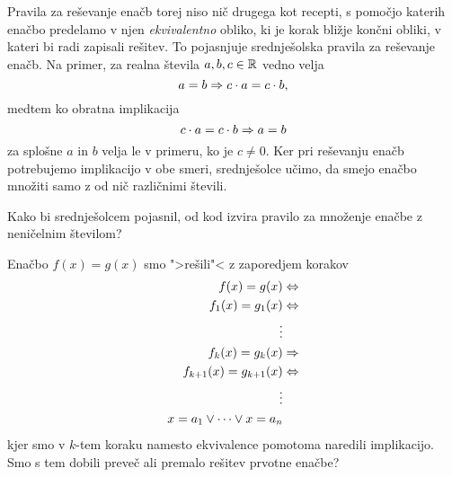 Pravila za reševanje enačb torej niso nič drugega kot recepti, s
pomočjo katerih enačbo predelamo v njen \emph{ekvivalentno} obliko, ki
je korak bližje končni obliki, v kateri bi radi zapisali rešitev. To
pojasnjuje srednješolska pravila za reševanje enačb. Na primer, za
realna števila $a, b, c \in \mathbb{R}$ vedno velja
%
\begin{equation*}
  a = b \Rightarrow c \cdot a = c \cdot b,
\end{equation*}
%
medtem ko obratna implikacija
%
\begin{equation*}
  c \cdot a = c \cdot b \Rightarrow a = b
\end{equation*}
%
za splošne $a$ in $b$ velja le v primeru, ko je $c \neq 0$. Ker pri
reševanju enačb potrebujemo implikacijo v obe smeri, srednješolce
učimo, da smejo enačbo množiti samo z od nič različnimi števili.

\begin{vaja}
  Kako bi srednješolcem pojasnil, od kod izvira pravilo za množenje
  enačbe z neničelnim številom?
\end{vaja}

\begin{vaja}
  Enačbo $f(x) = g(x)$ smo ">rešili"< z zaporedjem korakov
  \begin{align*}
    f(x) = g(x) &\Leftrightarrow \\
    f_1(x) = g_1(x) &\Leftrightarrow \\
    \vdots & \\
    f_k(x) = g_k(x) &\Rightarrow \\
    f_{k+1}(x) = g_{k+1}(x) &\Leftrightarrow \\
    \vdots & \\
    x = a_1 \lor \cdots \lor x = a_n
  \end{align*}
  kjer smo v $k$-tem koraku namesto ekvivalence pomotoma naredili
  implikacijo. Smo s tem dobili preveč ali premalo rešitev prvotne
  enačbe?
\end{vaja}



